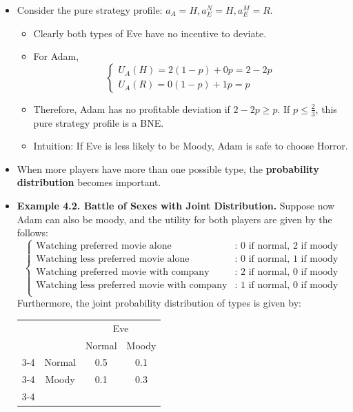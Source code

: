 \documentclass[notitlepage]{article}
\begin{document}
\begin{itemize}
    \item Consider the pure strategy profile: \(a_A = H, a_E^N = H, a_E^M = R\).
    \begin{itemize}
        \item Clearly both types of Eve have no incentive to deviate.
        \item For Adam,
        \[
        \begin{cases}
            U_A(H) = 2(1-p) + 0p = 2-2p \\
            U_A(R) = 0(1-p) + 1p = p
        \end{cases}
        \]
        \item Therefore, Adam has no profitable deviation if \(2-2p \ge p\). If \(p \le \frac{2}{3}\), this pure strategy profile is a BNE.
        \item Intuition: If Eve is less likely to be Moody, Adam is safe to choose Horror.
    \end{itemize}
    \item When more players have more than one possible type, the \textbf{probability distribution} becomes important.
    \item \textbf{Example 4.2. Battle of Sexes with Joint Distribution.} Suppose now Adam can also be moody, and the utility for both players are given by the follows:
    \[
    \begin{cases}
        \text{Watching preferred movie alone} & \text{: 0 if normal, 2 if moody} \\ 
        \text{Watching less preferred movie alone} & \text{: 0 if normal, 1 if moody} \\ 
        \text{Watching preferred movie with company} & \text{: 2 if normal, 0 if moody} \\ 
        \text{Watching less preferred movie with company} & \text{: 1 if normal, 0 if moody} \\ 
    \end{cases}
    \]
    Furthermore, the joint probability distribution of types is given by:
    \begin{table}[h]
    \centering
    \begin{tabular}{llcc}
    &&
    \multicolumn{2}{c}{Eve}  \\&& 
    Normal & 
    Moody
    \\ \cline{3-4} 
    \multirow{2}{*}{Adam} & 
    \multicolumn{1}{c|}{Normal} & 
    \multicolumn{1}{c|}{0.5} &
    \multicolumn{1}{c|}{0.1} 
    \\ \cline{3-4} & 
    \multicolumn{1}{c|}{Moody} & 
    \multicolumn{1}{c|}{0.1} &
    \multicolumn{1}{c|}{0.3} 
    \\ \cline{3-4}
    \end{tabular}
    \end{table}


\end{itemize}
\end{document}
